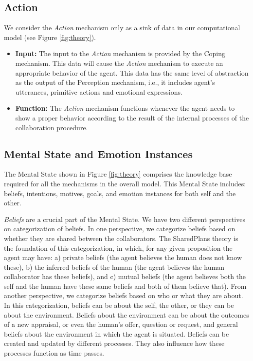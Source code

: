 \documentclass[12pt]{report}
\begin{document}
\subsection{Action}

We consider the \textit{Action} mechanism only as a sink of data in our
computational model (see Figure \ref{fig:theory}).

\begin{itemize}
  \item \textbf{Input:} The input to the \textit{Action} mechanism is provided by
  the Coping mechanism. This data will cause the \textit{Action} mechanism to
  execute an appropriate behavior of the agent. This data has the same level of
  abstraction as the output of the Perception mechanism, i.e., it includes agent's
  utterances, primitive actions and emotional expressions.
  
  \item \textbf{Function:} The \textit{Action} mechanism functions whenever the
  agent needs to show a proper behavior according to the result of the internal
  processes of the collaboration procedure.
\end{itemize}

\subsection{Mental State and Emotion Instances}
\label{sec:mental-states}
The Mental State shown in Figure \ref{fig:theory} comprises the knowledge
base required for all the mechanisms in the overall model. This
Mental State includes: beliefs, intentions, motives, goals, and emotion
instances for both self and the other.

\textit{Beliefs} are a crucial part of the Mental State. We have two different
perspectives on categorization of beliefs. In one perspective, we categorize
beliefs based on whether they are shared between the collaborators. The
SharedPlans \cite{grosz:plans-discourse} theory is the foundation of this
categorization, in which, for any given proposition the agent may have: a)
private beliefs (the agent believes the human does not know these), b) the
inferred beliefs of the human (the agent believes the human collaborator has
these beliefs), and c) mutual beliefs (the agent believes both the self and the
human have these same beliefs and both of them believe that). From another
perspective, we categorize beliefs based on who or what they are about. In this
categorization, beliefs can be about the self, the other, or they can be about
the environment. Beliefs about the environment can be about the
outcomes of a new appraisal, or even the human's offer, question or request, and
general beliefs about the environment in which the agent is situated. Beliefs
can be created and updated by different processes. They also influence how these
processes function as time passes.
\end{document}
